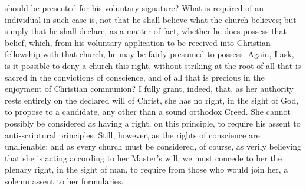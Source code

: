 \documentclass[
]{book}
\begin{document}
should be presented for his voluntary signature? What is required of an individual in such case is, not that he shall believe what the church believes; but simply that he shall declare, as a matter of fact, whether he does possess that belief, which, from his voluntary application to be received into Christian fellowship with that church, he may be fairly presumed to possess. Again, I ask, is it possible to deny a church this right, without striking at the root of all that is sacred in the convictions of conscience, and of all that is precious in the enjoyment of Christian communion? I fully grant, indeed, that, as her authority rests entirely on the declared will of Christ, she has no right, in the sight of God, to propose to a candidate, any other than a sound orthodox Creed. She cannot possibly be considered as having a right, on this principle, to require his assent to anti-scriptural principles. Still, however, as the rights of conscience are unalienable; and as every church must be considered, of course, as verily believing that she is acting according to her Master's will, we must concede to her the plenary right, in the sight of man, to require from those who would join her, a solemn assent to her formularies.
\end{document}
